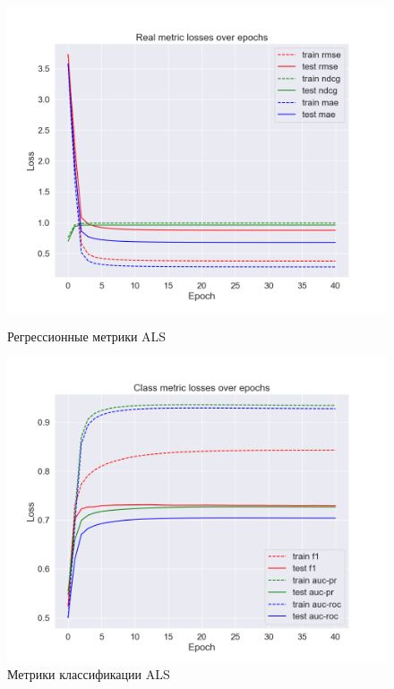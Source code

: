 \begin{figure}[h!]
\centering
\begin{minipage}{.5\textwidth}
\centering
\includegraphics[width=1.0\linewidth]{images/als/real_losses}
\caption{Регрессионные метрики ALS}
\label{fig:als_real_losses}
\end{minipage}%
\begin{minipage}{.5\textwidth}
\centering
\includegraphics[width=1.0\linewidth]{images/als/class_losses}
\caption{Метрики классификации ALS}
\label{fig:als_class_losses}
\end{minipage}
\end{figure}


